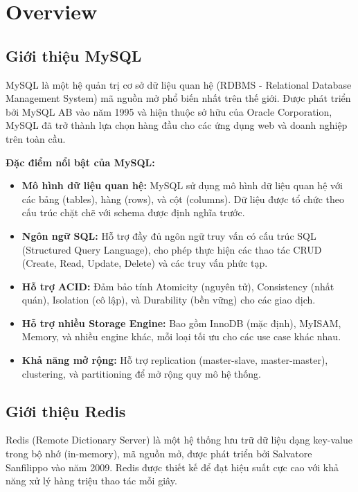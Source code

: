 \chapter{Overview}
\section{Giới thiệu MySQL}

MySQL là một hệ quản trị cơ sở dữ liệu quan hệ (RDBMS - Relational Database Management System) mã nguồn mở phổ biến nhất trên thế giới. Được phát triển bởi MySQL AB vào năm 1995 và hiện thuộc sở hữu của Oracle Corporation, MySQL đã trở thành lựa chọn hàng đầu cho các ứng dụng web và doanh nghiệp trên toàn cầu.

\textbf{Đặc điểm nổi bật của MySQL:}
\begin{itemize}
    \item \textbf{Mô hình dữ liệu quan hệ:} MySQL sử dụng mô hình dữ liệu quan hệ với các bảng (tables), hàng (rows), và cột (columns). Dữ liệu được tổ chức theo cấu trúc chặt chẽ với schema được định nghĩa trước.
    \item \textbf{Ngôn ngữ SQL:} Hỗ trợ đầy đủ ngôn ngữ truy vấn có cấu trúc SQL (Structured Query Language), cho phép thực hiện các thao tác CRUD (Create, Read, Update, Delete) và các truy vấn phức tạp.
    \item \textbf{Hỗ trợ ACID:} Đảm bảo tính Atomicity (nguyên tử), Consistency (nhất quán), Isolation (cô lập), và Durability (bền vững) cho các giao dịch.
    \item \textbf{Hỗ trợ nhiều Storage Engine:} Bao gồm InnoDB (mặc định), MyISAM, Memory, và nhiều engine khác, mỗi loại tối ưu cho các use case khác nhau.
    \item \textbf{Khả năng mở rộng:} Hỗ trợ replication (master-slave, master-master), clustering, và partitioning để mở rộng quy mô hệ thống.
\end{itemize}

\section{Giới thiệu Redis}

Redis (Remote Dictionary Server) là một hệ thống lưu trữ dữ liệu dạng key-value trong bộ nhớ (in-memory), mã nguồn mở, được phát triển bởi Salvatore Sanfilippo vào năm 2009. Redis được thiết kế để đạt hiệu suất cực cao với khả năng xử lý hàng triệu thao tác mỗi giây.

